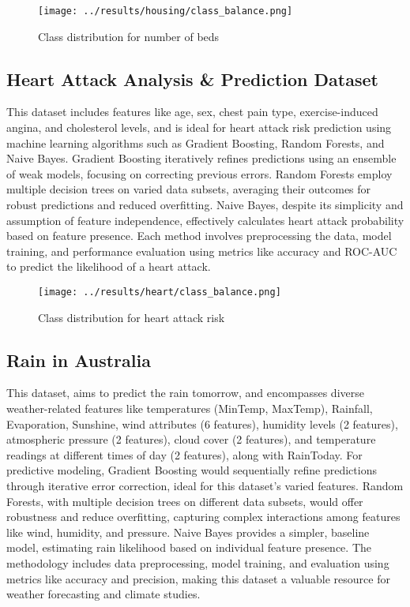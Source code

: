 \documentclass[10pt,twocolumn,letterpaper]{article}
\begin{document}
\begin{figure}[h]
  \texttt{[image: ../results/housing/class\_balance.png]}
  \caption{Class distribution for number of beds}
\end{figure}

\subsection{Heart Attack Analysis \& Prediction Dataset \cite{ds2}}

This dataset includes features like age, sex, chest pain type, exercise-induced angina, and cholesterol levels, and is ideal for heart attack risk prediction using machine learning algorithms such as Gradient Boosting, Random Forests, and Naive Bayes.
Gradient Boosting iteratively refines predictions using an ensemble of weak models, focusing on correcting previous errors.
Random Forests employ multiple decision trees on varied data subsets, averaging their outcomes for robust predictions and reduced overfitting.
Naive Bayes, despite its simplicity and assumption of feature independence, effectively calculates heart attack probability based on feature presence.
Each method involves preprocessing the data, model training, and performance evaluation using metrics like accuracy and ROC-AUC to predict the likelihood of a heart attack.

\begin{figure}[h]
  \texttt{[image: ../results/heart/class\_balance.png]}
  \caption{Class distribution for heart attack risk}
\end{figure}

\subsection{Rain in Australia \cite{ds3}}

This dataset, aims to predict the rain tomorrow, and encompasses diverse weather-related features like temperatures (MinTemp, MaxTemp), Rainfall, Evaporation, Sunshine, wind attributes (6 features), humidity levels (2 features), atmospheric pressure (2 features), cloud cover (2 features), and temperature readings at different times of day (2 features), along with RainToday.
For predictive modeling, Gradient Boosting would sequentially refine predictions through iterative error correction, ideal for this dataset’s varied features.
Random Forests, with multiple decision trees on different data subsets, would offer robustness and reduce overfitting, capturing complex interactions among features like wind, humidity, and pressure.
Naive Bayes provides a simpler, baseline model, estimating rain likelihood based on individual feature presence.
The methodology includes data preprocessing, model training, and evaluation using metrics like accuracy and precision, making this dataset a valuable resource for weather forecasting and climate studies.
\end{document}
